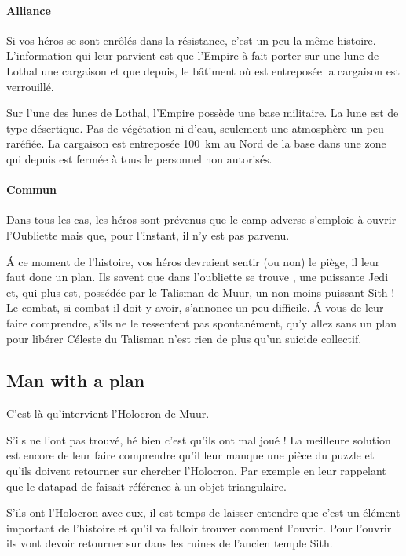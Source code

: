 \paragraph{Alliance}
Si vos héros se sont enrôlés dans la résistance, c’est un peu la même histoire. L’information qui leur parvient est que l’Empire à fait porter sur une lune de Lothal une cargaison et que depuis, le bâtiment où est entreposée la cargaison est verrouillé. 

Sur l’une des lunes de Lothal, l’Empire possède une base militaire. La lune est de type désertique. Pas de végétation ni d’eau, seulement une atmosphère un peu raréfiée. La cargaison est entreposée 100~km au Nord de la base dans une zone qui depuis est fermée à tous le personnel non autorisés.

\paragraph{Commun}
Dans tous les cas, les héros sont prévenus que le camp adverse s’emploie à ouvrir l’Oubliette mais que, pour l’instant, il n’y est pas parvenu.

\'A ce moment de l’histoire, vos héros devraient sentir (ou non) le piège, il leur faut donc un plan. Ils savent que dans l’oubliette se trouve , une puissante Jedi et, qui plus est, possédée par le Talisman de Muur, un non moins puissant Sith ! Le combat, si combat il doit y avoir, s’annonce un peu difficile. \'A vous de leur faire comprendre, s’ils ne le ressentent pas spontanément, qu’y allez sans un plan pour libérer Céleste du Talisman n’est rien de plus qu’un suicide collectif.

\subsection{Man with a plan}
C’est là qu’intervient l’Holocron de Muur.

S’ils ne l’ont pas trouvé, hé bien c’est qu’ils ont mal joué ! La meilleure solution est encore de leur faire comprendre qu’il leur manque une pièce du puzzle et qu’ils doivent retourner sur  chercher l’Holocron. Par exemple en leur rappelant que le datapad de  faisait référence à un objet triangulaire.

S’ils ont l’Holocron avec eux, il est temps de laisser entendre que c’est un élément important de l’histoire et qu’il va falloir trouver comment l’ouvrir. Pour l’ouvrir ils vont devoir retourner sur  dans les ruines de l’ancien temple Sith. 

